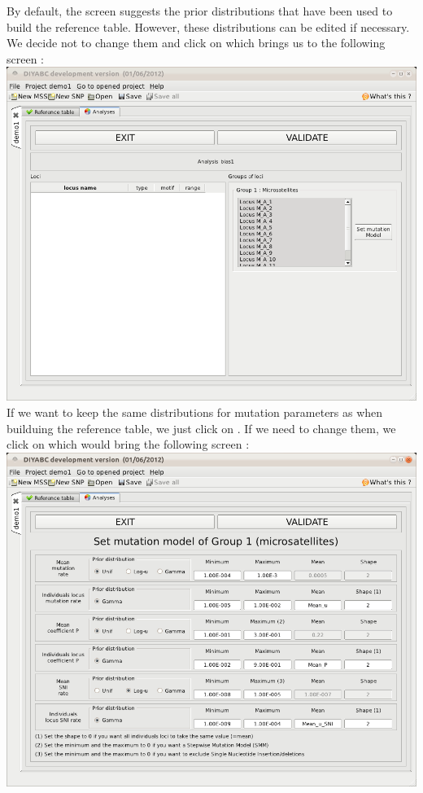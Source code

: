 By default, the screen suggests the prior distributions that have been used to build the reference table. However, these distributions can be edited if necessary. We decide not to change them and click on  which brings us to the following screen :\\

\includegraphics[scale=0.35]{gui_pictures/Capture-DIYABC-47.png} \\

If we want to keep the same distributions for mutation parameters as when builduing the reference table, we just click on . If we need to change them, we click on  which would bring the following screen :\\

\includegraphics[scale=0.35]{gui_pictures/Capture-DIYABC-48.png} \\


